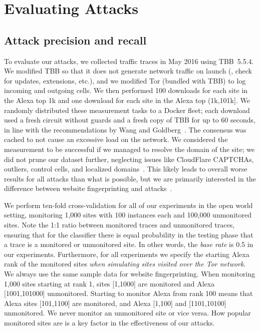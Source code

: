 \section{Evaluating \name Attacks}
\label{sec:analysis}

\subsection{Attack precision and recall}

To evaluate our \name attacks, we collected traffic traces in May
2016 using TBB~5.5.4.
We modified TBB so that it does not generate network traffic on launch
(\ie, check for
updates, extensions, etc.), and we modified
Tor (bundled with TBB) to log incoming and outgoing cells.
We then performed 100 downloads for each site in the Alexa top
1k and one download for each site in the
Alexa top (1k,101k]. We randomly distributed these measurement tasks
to a Docker fleet; each download used a fresh circuit without
guards and a fresh copy of TBB for up to 60 seconds,
in line with the recommendations by Wang and Goldberg~\cite{Wang2013a}.
The consensus was cached to not cause an excessive load on the network.
We considered the measurement to be successful if we managed to resolve
the domain of the site;
we did not prune our dataset further, neglecting issues like CloudFlare
CAPTCHAs, outliers, control cells, and localized domains~\cite{Juarez2014a}.
This likely leads to overall worse results for all attacks than what is
possible, but we are primarily interested in the difference between website
fingerprinting and \name attacks~\cite{Wang2013a}.

We perform ten-fold cross-validation for all of our experiments in the open
world setting, monitoring 1,000 sites with 100 instances each and
100,000 unmonitored sites.
Note the 1:1 ratio between monitored traces and unmonitored traces,
ensuring that for the classifier there is equal probability in the testing
phase that a trace is a monitored or unmonitored site.
In other words, the \emph{base rate} is 0.5 in our experiments.
Furthermore, for all experiments we specify the starting Alexa rank of the
monitored sites
\emph{when simulating sites visited over the Tor network}.
We always use the same sample data for website fingerprinting.
When monitoring 1,000 sites starting at rank 1, sites
[1,1000] are monitored and Alexa [1001,101000] unmonitored. Starting to
monitor Alexa from rank 100 means that Alexa sites [101,1100] are monitored,
and Alexa [1,100] and [1101,10100] unmonitored.
We never monitor an unmonitored site or vice versa.
How popular monitored sites
are is a key factor in the effectiveness of our attacks.

